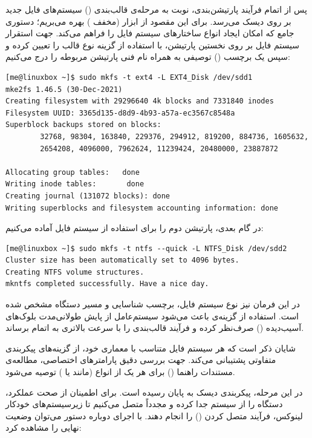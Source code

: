 پس از اتمام فرآیند پارتیشن‌بندی، نوبت به مرحله‌ی قالب‌بندی () سیستم‌های فایل جدید بر روی دیسک می‌رسد. برای این مقصود از ابزار  (مخفف ) بهره می‌بریم؛ دستوری جامع که امکان ایجاد انواع ساختارهای سیستم فایل را فراهم می‌کند. جهت استقرار سیستم فایل  بر روی نخستین پارتیشن، با استفاده از گزینه  نوع قالب را تعیین کرده و سپس یک برچسب () توصیفی به همراه نام فنی پارتیشن مربوطه را درج می‌کنیم:

\begin{latin}
\begin{lstlisting}
[me@linuxbox ~]$ sudo mkfs -t ext4 -L EXT4_Disk /dev/sdd1
mke2fs 1.46.5 (30-Dec-2021)
Creating filesystem with 29296640 4k blocks and 7331840 inodes
Filesystem UUID: 3365d135-d8d9-4b93-a57a-ec3567c8548a
Superblock backups stored on blocks:
        32768, 98304, 163840, 229376, 294912, 819200, 884736, 1605632,
        2654208, 4096000, 7962624, 11239424, 20480000, 23887872

Allocating group tables:   done
Writing inode tables:       done
Creating journal (131072 blocks): done
Writing superblocks and filesystem accounting information: done
\end{lstlisting}
\end{latin}

در گام بعدی، پارتیشن دوم را برای استفاده از سیستم فایل  آماده می‌کنیم:

\begin{latin}
\begin{lstlisting}
[me@linuxbox ~]$ sudo mkfs -t ntfs --quick -L NTFS_Disk /dev/sdd2
Cluster size has been automatically set to 4096 bytes.
Creating NTFS volume structures.
mkntfs completed successfully. Have a nice day.
\end{lstlisting}
\end{latin}

در این فرمان نیز نوع سیستم فایل، برچسب شناسایی و مسیر دستگاه مشخص شده است. استفاده از گزینه‌ی  باعث می‌شود سیستم‌عامل از پایش طولانی‌مدت بلوک‌های آسیب‌دیده () صرف‌نظر کرده و فرآیند قالب‌بندی را با سرعت بالاتری به اتمام برساند.

شایان ذکر است که هر سیستم فایل متناسب با معماری خود، از گزینه‌های پیکربندی متفاوتی پشتیبانی می‌کند. جهت بررسی دقیق پارامترهای اختصاصی، مطالعه‌ی مستندات راهنما () برای هر یک از انواع  (مانند  یا ) توصیه می‌شود.

در این مرحله، پیکربندی دیسک به پایان رسیده است. برای اطمینان از صحت عملکرد، دستگاه را از سیستم جدا کرده و مجدداً متصل می‌کنیم تا زیرسیستم‌های خودکار لینوکس، فرآیند متصل کردن () را انجام دهند. با اجرای دوباره دستور  می‌توان وضعیت نهایی را مشاهده کرد:

